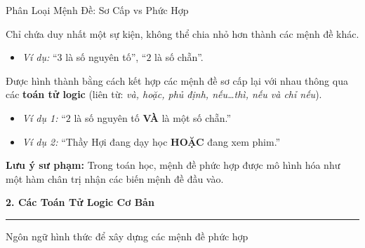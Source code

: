\documentclass[aspectratio=169, 10pt]{beamer}
\begin{document}
\begin{frame}{Phân Loại Mệnh Đề: Sơ Cấp vs Phức Hợp}
  \begin{cozyDef}
    \small
    Chỉ chứa duy nhất một sự kiện, không thể chia nhỏ hơn thành các mệnh đề khác.
    \begin{itemize}
      \item \textit{Ví dụ:} ``$3$ là số nguyên tố'', ``$2$ là số chẵn''.
    \end{itemize}
  \end{cozyDef}
  \vspace{0.15cm}
  \begin{cozyMethod}
    \small
    Được hình thành bằng cách kết hợp các mệnh đề sơ cấp lại với nhau thông qua các \textbf{toán tử logic} (liên từ: \textit{và, hoặc, phủ định, nếu\dots thì, nếu và chỉ nếu}).
    \begin{itemize}
      \item \textit{Ví dụ 1:} ``$2$ là số nguyên tố \textbf{\color{cozyWarm}VÀ} là một số chẵn.''
      \item \textit{Ví dụ 2:} ``Thầy Hợi đang dạy học \textbf{\color{cozyWarm}HOẶC} đang xem phim.''
    \end{itemize}
    \vspace{0.1cm}
    \par
    \textbf{\color{cozySlate}Lưu ý sư phạm:} Trong toán học, mệnh đề phức hợp được mô hình hóa như một hàm chân trị nhận các biến mệnh đề đầu vào.
  \end{cozyMethod}
\end{frame}


\begin{frame}[plain]
  \centering
  \vspace*{2.0cm}
  {\LARGE\textbf{\color{cozySlate}2. Các Toán Tử Logic Cơ Bản}}
  \par\vspace{0.4cm}
  {\color{cozyWarm}\rule{0.6\textwidth}{1.5pt}}
  \par\vspace{0.3cm}
  {\normalsize\color{cozyMuted}Ngôn ngữ hình thức để xây dựng các mệnh đề phức hợp}
\end{frame}
\end{document}
